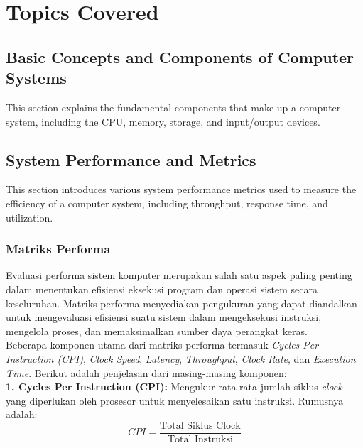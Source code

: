 \documentclass[12pt]{article}
\begin{document}
\section{Topics Covered}

\subsection{Basic Concepts and Components of Computer Systems}
This section explains the fundamental components that make up a computer system, including the CPU, memory, storage, and input/output devices.

\subsection{System Performance and Metrics}
This section introduces various system performance metrics used to measure the efficiency of a computer system, including throughput, response time, and utilization.

\subsubsection{Matriks Performa}
\label{subsec:performance_matrix}

\quad Evaluasi performa sistem komputer merupakan salah satu aspek paling penting dalam menentukan efisiensi eksekusi program dan operasi sistem secara keseluruhan. Matriks performa menyediakan pengukuran yang dapat diandalkan untuk mengevaluasi efisiensi suatu sistem dalam mengeksekusi instruksi, mengelola proses, dan memaksimalkan sumber daya perangkat keras.\\

Beberapa komponen utama dari matriks performa termasuk \textit{Cycles Per Instruction (CPI)}, \textit{Clock Speed}, \textit{Latency}, \textit{Throughput}, \textit{Clock Rate}, dan \textit{Execution Time}. Berikut adalah penjelasan dari masing-masing komponen:\\

\textbf{1. Cycles Per Instruction (CPI):} Mengukur rata-rata jumlah siklus \textit{clock} yang diperlukan oleh prosesor untuk menyelesaikan satu instruksi. Rumusnya adalah:\\

\begin{equation}
CPI = \frac{\text{Total Siklus Clock}}{\text{Total Instruksi}}
\end{equation}\\
\end{document}
